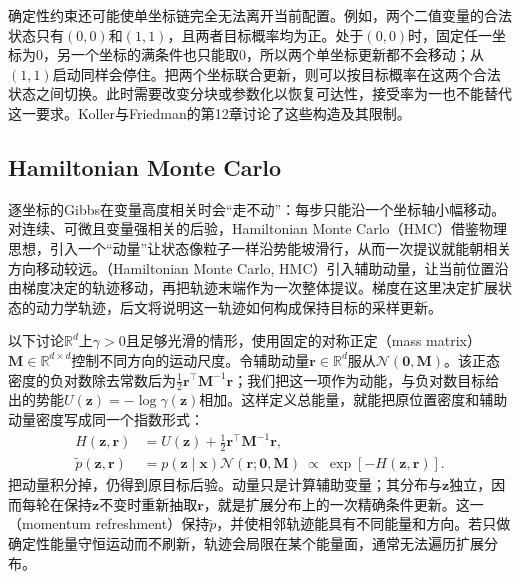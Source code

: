 确定性约束还可能使单坐标链完全无法离开当前配置。例如，两个二值变量的合法状态只有$(0,0)$和$(1,1)$，且两者目标概率均为正。处于$(0,0)$时，固定任一坐标为$0$，另一个坐标的满条件也只能取$0$，所以两个单坐标更新都不会移动；从$(1,1)$启动同样会停住。把两个坐标联合更新，则可以按目标概率在这两个合法状态之间切换。此时需要改变分块或参数化以恢复可达性，接受率为一也不能替代这一要求。Koller与Friedman的第12章讨论了这些构造及其限制。

\subsection{Hamiltonian Monte Carlo}
\label{sec:pgm-sampling-hmc}

逐坐标的Gibbs在变量高度相关时会“走不动”：每步只能沿一个坐标轴小幅移动。对连续、可微且变量强相关的后验，Hamiltonian Monte Carlo（HMC）借鉴物理思想，引入一个“动量”让状态像粒子一样沿势能坡滑行，从而一次提议就能朝相关方向移动较远。（Hamiltonian Monte Carlo, HMC）引入辅助动量，让当前位置沿由梯度决定的轨迹移动，再把轨迹末端作为一次整体提议。梯度在这里决定扩展状态的动力学轨迹，后文将说明这一轨迹如何构成保持目标的采样更新。

以下讨论$\mathbb{R}^{d}$上$\gamma>0$且足够光滑的情形，使用固定的对称正定（mass matrix）$\bm{M}\in\mathbb{R}^{d\times d}$控制不同方向的运动尺度。令辅助动量$\bm{r}\in\mathbb{R}^{d}$服从$\mathcal{N}(\bm{0},\bm{M})$。该正态密度的负对数除去常数后为$\frac12\bm{r}^{\top}\bm{M}^{-1}\bm{r}$；我们把这一项作为动能，与负对数目标给出的势能$U(\bm{z})=-\log\gamma(\bm{z})$相加。这样定义总能量，就能把原位置密度和辅助动量密度写成同一个指数形式：
\begin{equation}
  \begin{aligned}
    H(\bm{z},\bm{r})&=U(\bm{z})+\frac12\bm{r}^{\top}\bm{M}^{-1}\bm{r},\\
    \widetilde p(\bm{z},\bm{r})
      &=p(\bm{z}\mid\bm{x})\mathcal{N}(\bm{r};\bm{0},\bm{M})
        \ \propto\ \exp[-H(\bm{z},\bm{r})].
  \end{aligned}
  \label{eq:pgm-sampling-hamiltonian}
\end{equation}
把动量积分掉，仍得到原目标后验。动量只是计算辅助变量；其分布与$\bm{z}$独立，因而每轮在保持$\bm{z}$不变时重新抽取$\bm{r}$，就是扩展分布上的一次精确条件更新。这一（momentum refreshment）保持$\widetilde p$，并使相邻轨迹能具有不同能量和方向。若只做确定性能量守恒运动而不刷新，轨迹会局限在某个能量面，通常无法遍历扩展分布。


